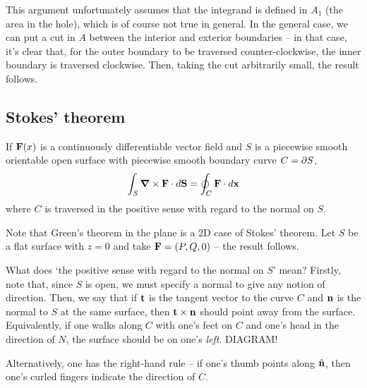 \documentclass{../../template/note}
\begin{document}
    \begin{remark*}
        This argument unfortunately assumes that the integrand is defined in \(A_1\) (the area in the hole), which is of course not true in general. In the general case, we can put a cut in \(A\) between the interior and exterior boundaries -- in that case, it's clear that, for the outer boundary to be traversed counter-clockwise, the inner boundary is traversed clockwise. Then, taking the cut arbitrarily small, the result follows.
    \end{remark*}
    
    \subsection{Stokes' theorem}

    \begin{theorem}
        If \(\V F(x)\) is a continuously differentiable vector field and \(S\) is a piecewise smooth orientable open surface with piecewise smooth boundary curve \(C = \partial S\),
        \begin{align*}
            \int_S \curl \V F \cdot d\V S = \oint_C \V F \cdot d\V x
        \end{align*}
        where \(C\) is traversed in the positive sense with regard to the normal on \(S\).  
    \end{theorem}
    
    \begin{remark*}
        Note that Green's theorem in the plane is a 2D case of Stokes' theorem. Let \(S\) be a flat surface with \(z=0\) and take \(\V F = (P, Q, 0)\) -- the result follows.
    \end{remark*}
    
    What does `the positive sense with regard to the normal on \(S\)' mean? Firstly, note that, since \(S\) is open, we must specify a normal to give any notion of direction. Then, we say that if \(\V t\) is the tangent vector to the curve \(C\) and \(\V n\) is the normal to \(S\) at the same surface, then \(\V t \times \V n\) should point away from the surface. Equivalently, if one walks along \(C\) with one's feet on \(C\) and one's head in the direction of \(N\), the surface should be on one's \emph{left}. DIAGRAM!

    Alternatively, one has the right-hand rule -- if one's thumb points along \(\hvec n\), then one's curled fingers indicate the direction of \(C\). 
\end{document}
